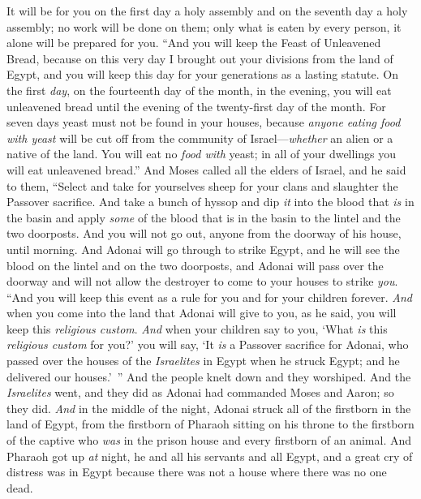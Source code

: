 \begin{biblechapter}
\verse It will be for you on the first day a holy assembly and on the seventh day a holy assembly; no work will be done on them; only what is eaten by every person, it alone will be prepared for you.
\verse “And you will keep the Feast of Unleavened Bread, because on this very day I brought out your divisions from the land of Egypt, and you will keep this day for your generations as a lasting statute.
\verse On the first \textit{day}, on the fourteenth day of the month, in the evening, you will eat unleavened bread until the evening of the twenty-first day of the month.
\verse For seven days yeast must not be found in your houses, because \textit{anyone eating food with yeast} will be cut off from the community of Israel—\textit{whether} an alien or a native of the land.
\verse You will eat no \textit{food with} yeast; in all of your dwellings you will eat unleavened bread.”
\verse And Moses called all the elders of Israel, and he said to them, “Select and take for yourselves sheep for your clans and slaughter the Passover sacrifice.
\verse And take a bunch of hyssop and dip \textit{it} into the blood that \textit{is} in the basin and apply \textit{some} of the blood that is in the basin to the lintel and the two doorposts. And you will not go out, anyone from the doorway of his house, until morning.
\verse And Adonai will go through to strike Egypt, and he will see the blood on the lintel and on the two doorposts, and Adonai will pass over the doorway and will not allow the destroyer to come to your houses to strike \textit{you}.
\verse “And you will keep this event as a rule for you and for your children forever.
\verse \textit{And} when you come into the land that Adonai will give to you, as he said, you will keep this \textit{religious custom}.
\verse \textit{And} when your children say to you, ‘What \textit{is} this \textit{religious custom} for you?’
\verse you will say, ‘It \textit{is} a Passover sacrifice for Adonai, who passed over the houses of the \textit{Israelites} in Egypt when he struck Egypt; and he delivered our houses.’ ” And the people knelt down and they worshiped.
\verse And the \textit{Israelites} went, and they did as Adonai had commanded Moses and Aaron; so they did.
 \textit{And} in the middle of the night, Adonai struck all of the firstborn in the land of Egypt, from the firstborn of Pharaoh sitting on his throne to the firstborn of the captive who \textit{was} in the prison house and every firstborn of an animal.
\verse And Pharaoh got up \textit{at} night, he and all his servants and all Egypt, and a great cry of distress was in Egypt because there was not a house where there was no one dead.

\end{biblechapter}

